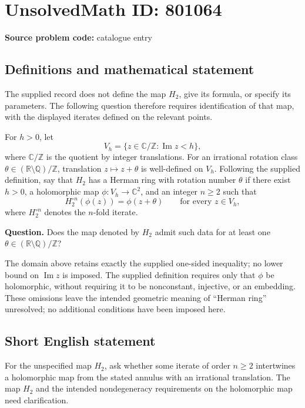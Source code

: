 \documentclass[11pt]{article}
\newcommand{\Z}{\mathbb{Z}}
\newcommand{\Q}{\mathbb{Q}}
\newcommand{\R}{\mathbb{R}}
\newcommand{\C}{\mathbb{C}}
\begin{document}
\section*{UnsolvedMath ID: 801064}
\textbf{Source problem code:} catalogue entry
\subsection{Definitions and mathematical statement}
The supplied record does not define the map \(H_2\), give its formula, or specify its parameters. The following question therefore requires identification of that map, with the displayed iterates defined on the relevant points.

For \(h>0\), let
\[
V_h=\{z\in\C/\Z:\operatorname{Im}z<h\},
\]
where \(\C/\Z\) is the quotient by integer translations. For an irrational rotation class \(\theta\in(\R\setminus\Q)/\Z\), translation \(z\mapsto z+\theta\) is well-defined on \(V_h\). Following the supplied definition, say that \(H_2\) has a Herman ring with rotation number \(\theta\) if there exist \(h>0\), a holomorphic map \(\phi:V_h\to\C^2\), and an integer \(n\geq2\) such that
\[
H_2^{\circ n}(\phi(z))=\phi(z+\theta)
\qquad\text{for every }z\in V_h,
\]
where \(H_2^{\circ n}\) denotes the \(n\)-fold iterate.

\textbf{Question.} Does the map denoted by \(H_2\) admit such data for at least one \(\theta\in(\R\setminus\Q)/\Z\)?

The domain above retains exactly the supplied one-sided inequality; no lower bound on \(\operatorname{Im}z\) is imposed. The supplied definition requires only that \(\phi\) be holomorphic, without requiring it to be nonconstant, injective, or an embedding. These omissions leave the intended geometric meaning of ``Herman ring'' unresolved; no additional conditions have been imposed here.
\subsection{Short English statement}
For the unspecified map \(H_2\), ask whether some iterate of order \(n\geq2\) intertwines a holomorphic map from the stated annulus with an irrational translation. The map \(H_2\) and the intended nondegeneracy requirements on the holomorphic map need clarification.
\end{document}
